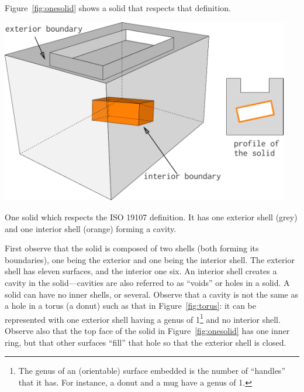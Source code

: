 Figure~\ref{fig:onesolid} shows a solid that respects that definition.
\begin{marginfigure}
  \centering
  \includegraphics[width=0.95\textwidth]{figs/isosolid.pdf}
  \caption{One solid which respects the ISO 19107 definition. It has one exterior shell (grey) and one interior shell (orange) forming a cavity.}%
\label{fig:onesolid}
\end{marginfigure}
First observe that the solid is composed of two shells (both forming its boundaries), one being the exterior and one being the interior shell.
The exterior shell has eleven surfaces, and the interior one six.
An interior shell creates a cavity in the solid---cavities are also referred to as ``voids'' or holes in a solid.
A solid can have no inner shells, or several.
Observe that a cavity is not the same as a hole in a torus (a donut) such as that in Figure~\ref{fig:torus}: it can be represented with one exterior shell having a genus of 1\footnote{The genus of an (orientable) surface embedded is the number of ``handles'' that it has. For instance, a donut and a mug have a genus of 1.} and no interior shell.
Observe also that the top face of the solid in Figure~\ref{fig:onesolid} has one inner ring, but that other surfaces ``fill'' that hole so that the exterior shell is closed.
